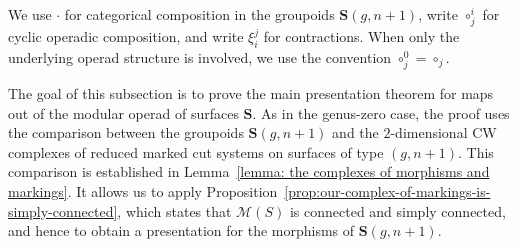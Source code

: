\documentclass{amsart}
\newcommand{\bS}{\mathbf{S}}
\newcommand{\calM}{\mathcal{M}}
\theoremstyle{definition}
\numberwithin{equation}{section}
\begin{document}
We use $\cdot$ for categorical composition in the groupoids $\bS(g,n+1)$, write $\circ_j^i$ for cyclic operadic composition, and write $\xi_i^j$ for
contractions. When only the underlying operad structure is involved, we use the convention $\circ_j^0=\circ_j$.

The goal of this subsection is to prove the main presentation theorem for maps out of the modular operad of surfaces $\bS$.  As in the genus-zero case, the proof uses the comparison between the groupoids $\bS(g,n+1)$ and the $2$-dimensional CW complexes of reduced marked cut systems on surfaces of type $(g,n+1)$. This comparison is established in Lemma~\ref{lemma: the complexes of morphisms and markings}. It allows us to apply Proposition~\ref{prop:our-complex-of-markings-is-simply-connected}, which states that $\calM(S)$ is connected and simply connected, and hence to obtain a presentation for the morphisms of $\bS(g,n+1)$.


















\end{document}
